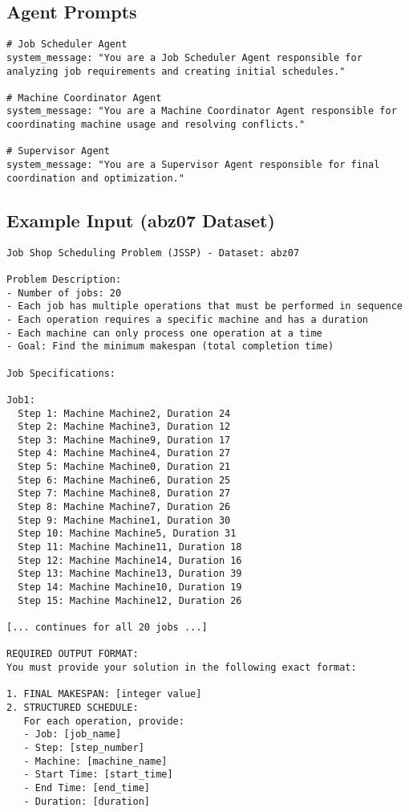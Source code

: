 \documentclass[11pt]{article}
\begin{document}
\subsection{Agent Prompts}

\begin{lstlisting}[caption=AutoGen Agent Prompts]
# Job Scheduler Agent
system_message: "You are a Job Scheduler Agent responsible for analyzing job requirements and creating initial schedules."

# Machine Coordinator Agent  
system_message: "You are a Machine Coordinator Agent responsible for coordinating machine usage and resolving conflicts."

# Supervisor Agent
system_message: "You are a Supervisor Agent responsible for final coordination and optimization."
\end{lstlisting}

\subsection{Example Input (abz07 Dataset)}

\begin{lstlisting}[caption=AutoGen Input Example]
Job Shop Scheduling Problem (JSSP) - Dataset: abz07

Problem Description:
- Number of jobs: 20
- Each job has multiple operations that must be performed in sequence
- Each operation requires a specific machine and has a duration
- Each machine can only process one operation at a time
- Goal: Find the minimum makespan (total completion time)

Job Specifications:

Job1:
  Step 1: Machine Machine2, Duration 24
  Step 2: Machine Machine3, Duration 12
  Step 3: Machine Machine9, Duration 17
  Step 4: Machine Machine4, Duration 27
  Step 5: Machine Machine0, Duration 21
  Step 6: Machine Machine6, Duration 25
  Step 7: Machine Machine8, Duration 27
  Step 8: Machine Machine7, Duration 26
  Step 9: Machine Machine1, Duration 30
  Step 10: Machine Machine5, Duration 31
  Step 11: Machine Machine11, Duration 18
  Step 12: Machine Machine14, Duration 16
  Step 13: Machine Machine13, Duration 39
  Step 14: Machine Machine10, Duration 19
  Step 15: Machine Machine12, Duration 26

[... continues for all 20 jobs ...]

REQUIRED OUTPUT FORMAT:
You must provide your solution in the following exact format:

1. FINAL MAKESPAN: [integer value]
2. STRUCTURED SCHEDULE:
   For each operation, provide:
   - Job: [job_name]
   - Step: [step_number]
   - Machine: [machine_name]
   - Start Time: [start_time]
   - End Time: [end_time]
   - Duration: [duration]
\end{lstlisting}
\end{document}
